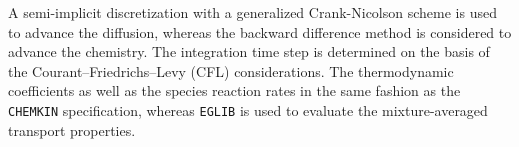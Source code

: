 A semi-implicit discretization with a generalized Crank-Nicolson scheme is used to advance the
diffusion, whereas the backward difference method is considered to advance the chemistry.
%
The integration time step is determined on the basis of the Courant–Friedrichs–Levy (CFL)
considerations.
%
The thermodynamic coefficients as well as the species reaction rates in the same fashion as the
\texttt{CHEMKIN} \cite{kee1990chemkin} specification, whereas \texttt{EGLIB}\cite{ern2004eglib} is
used to evaluate the mixture-averaged transport properties.
